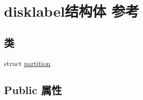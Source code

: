 \hypertarget{structdisklabel}{}\section{disklabel结构体 参考}
\label{structdisklabel}
\subsection*{类}
\begin{DoxyCompactItemize}
\item 
struct \hyperlink{structdisklabel_1_1partition}{partition}
\end{DoxyCompactItemize}
\subsection*{Public 属性}
